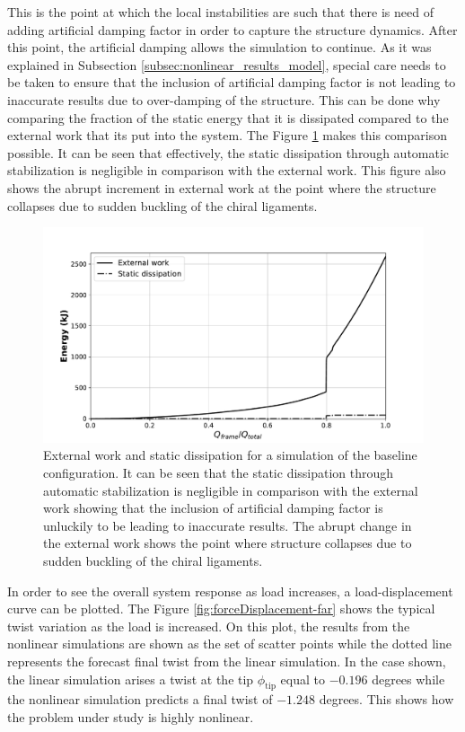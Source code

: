   This is the point at which the local instabilities are such that there is need of adding artificial damping factor in order to capture the structure dynamics. After this point, the artificial damping allows the simulation to continue. As it was explained in Subsection \ref{subsec:nonlinear_results_model}, special care needs to be taken to ensure that the inclusion of artificial damping factor is not leading to inaccurate results due to over-damping of the structure. This can be done why comparing the fraction of the static energy that it is dissipated compared to the external work that its put into the system. The Figure \ref{fig:energy} makes this comparison possible. It can be seen that effectively, the static dissipation through automatic stabilization is negligible in comparison with the external work. This figure also shows the abrupt increment in external work at the point where the structure collapses due to sudden buckling of the chiral ligaments.

  \begin{figure}[!htpb] %
    \centering
    \includegraphics[width=0.8 \textwidth]{../figures/result-sim/energy}
    \caption[External work and static dissipation for a simulation of the baseline configuration]{External work and static dissipation for a simulation of the baseline configuration. It can be seen that the static dissipation through automatic stabilization is negligible in comparison with the external work showing that the inclusion of artificial damping factor is unluckily to be leading to inaccurate results. The abrupt change in the external work shows the point where structure collapses due to sudden buckling of the chiral ligaments.}\label{fig:energy}
  \end{figure}

  In order to see the overall system response as load increases, a load-displacement curve can be plotted. The Figure \ref{fig:forceDisplacement-far} shows the typical twist variation as the load is increased. On this plot, the results from the nonlinear simulations are shown as the set of scatter points while the dotted line represents the forecast final twist from the linear simulation. In the case shown, the linear simulation arises a twist at the tip $\phi_{\mathrm{tip}}$ equal to $-0.196$ degrees while the nonlinear simulation predicts a final twist of $-1.248$ degrees. This shows how the problem under study is highly nonlinear.

